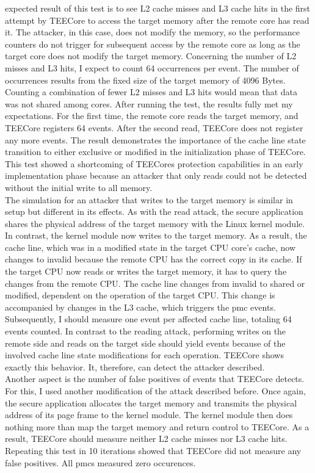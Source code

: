 expected result of this test is to see L2 cache misses and L3 cache hits in the
first attempt by TEECore to access the target memory after the remote core has
read it. The attacker, in this case, does not modify the memory, so the
performance counters do not trigger for subsequent access by the remote core as
long as the target core does not modify the target memory. Concerning the number
of L2 misses and L3 hits, I expect to count 64 occurrences per event. The number
of occurrences results from the fixed size of the target memory of 4096 Bytes.
Counting a combination of fewer L2 misses and L3 hits would mean that data was
not shared among cores. After running the test, the results fully met my
expectations. For the first time, the remote core reads the target memory, and
TEECore registers 64 events. After the second read, TEECore does not register
any more events. The result demonstrates the importance of the cache line state
transition to either exclusive or modified in the initialization phase of
TEECore. This test showed a shortcoming of TEECores protection capabilities in
an early implementation phase because an attacker that only reads could not be
detected without the initial write to all memory.\\

The simulation for an attacker that writes to the target memory is similar in
setup but different in its effects. As with the read attack, the secure
application shares the physical address of the target memory with the Linux
kernel module. In contrast, the kernel module now writes to the target memory.
As a result, the cache line, which was in a modified state in the target CPU
core's cache, now changes to invalid because the remote CPU has the correct copy
in its cache. If the target CPU now reads or writes the target memory, it has to
query the changes from the remote CPU. The cache line changes from invalid to
shared or modified, dependent on the operation of the target CPU. This change is
accompanied by changes in the L3 cache, which triggers the \gls{pmc} events.
Subsequently, I should measure one event per affected cache line, totaling 64
events counted. In contrast to the reading attack, performing writes on the
remote side and reads on the target side should yield events because of the
involved cache line state modifications for each operation. TEECore shows
exactly this behavior. It, therefore, can detect the attacker described.\\

Another aspect is the number of false positives of events that TEECore detects.
For this, I used another modification of the attack described before. Once
again, the secure application allocates the target memory and transmits the
physical address of its page frame to the kernel module. The kernel module then
does nothing more than map the target memory and return control to TEECore. As a
result, TEECore should measure neither L2 cache misses nor L3 cache hits.
Repeating this test in 10 iterations showed that TEECore did not measure any
false positives. All \glspl{pmc} measured zero occurences.\\

